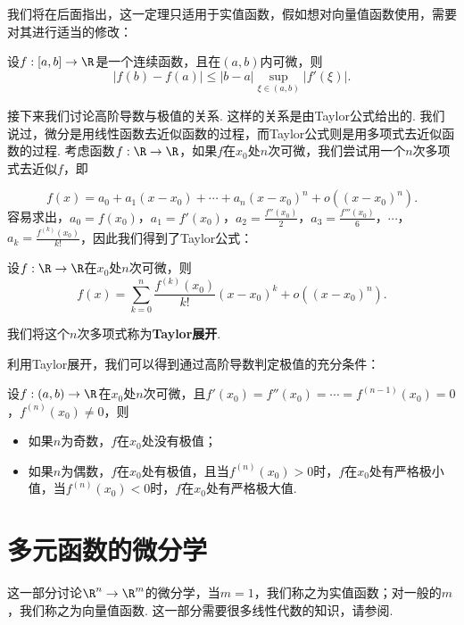 我们将在后面指出，这一定理只适用于实值函数，假如想对向量值函数使用，需要对其进行适当的修改：

\begin{theorem}[Lagrange有限增量定理]\label{thm:lagrange-finite}
    设$f:[a,b]\to\R$是一个连续函数，且在$(a,b)$内可微，则
    \[
        |f(b)-f(a)|\leq |b-a|\sup_{\xi\in(a,b)}|f'(\xi)|.
    \]
\end{theorem}

接下来我们讨论高阶导数与极值的关系. 这样的关系是由Taylor公式给出的. 我们说过，微分是用线性函数去近似函数的过程，而Taylor公式则是用多项式去近似函数的过程. 考虑函数$f:\R\to\R$，如果$f$在$x_0$处$n$次可微，我们尝试用一个$n$次多项式去近似$f$，即

\[
    f(x)=a_0+a_1(x-x_0)+\cdots+a_n(x-x_0)^n+o((x-x_0)^n).
\]
容易求出，$a_0=f(x_0)$，$a_1=f'(x_0)$，$a_2=\frac{f''(x_0)}{2}$，$a_3=\frac{f'''(x_0)}{6}$，$\cdots$，$a_k=\frac{f^{(k)}(x_0)}{k!}$，因此我们得到了Taylor公式：

\begin{theorem}
    设$f:\R\to\R$在$x_0$处$n$次可微，则
    \[
        f(x)=\sum_{k=0}^n\frac{f^{(k)}(x_0)}{k!}(x-x_0)^k+o((x-x_0)^n).
    \]
\end{theorem}

我们将这个$n$次多项式称为\textbf{Taylor展开}.

利用Taylor展开，我们可以得到通过高阶导数判定极值的充分条件：

\begin{theorem}\label{thm:extreme}
    设$f:(a,b)\to\R$在$x_0$处$n$次可微，且$f'(x_0)=f''(x_0)=\cdots=f^{(n-1)}(x_0)=0$，$f^{(n)}(x_0)\neq 0$，则
    \begin{itemize}
        \item 如果$n$为奇数，$f$在$x_0$处没有极值；
        \item 如果$n$为偶数，$f$在$x_0$处有极值，且当$f^{(n)}(x_0)>0$时，$f$在$x_0$处有严格极小值，当$f^{(n)}(x_0)<0$时，$f$在$x_0$处有严格极大值.
    \end{itemize}
\end{theorem}

\section{多元函数的微分学}

这一部分讨论$\R^n\to\R^m$的微分学，当$m=1$，我们称之为实值函数；对一般的$m$，我们称之为向量值函数. 这一部分需要很多线性代数的知识，请参阅.

